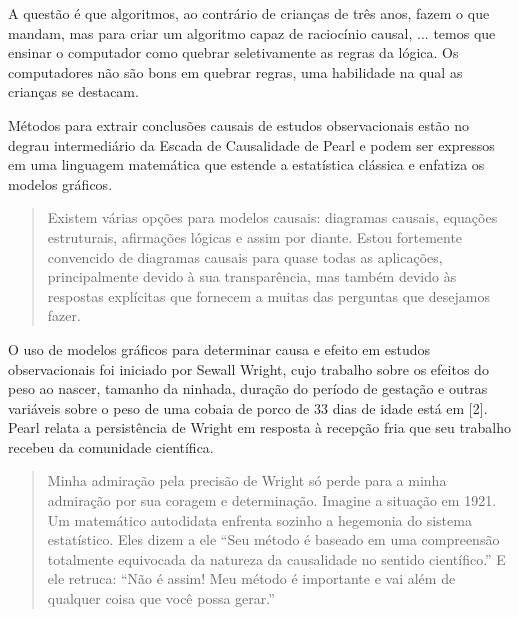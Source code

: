     A questão é que algoritmos, ao contrário de crianças de três anos, fazem o que mandam, mas para criar um algoritmo capaz de raciocínio causal, ... temos que ensinar o computador como quebrar seletivamente as regras da lógica. Os computadores não são bons em quebrar regras, uma habilidade na qual as crianças se destacam.



\noindent
\begin{minipage}[!ht]{\columnwidth}\centering
{}
\label{fig:01}
\end{minipage}



    Métodos para extrair conclusões causais de estudos observacionais estão no degrau intermediário da Escada de Causalidade de Pearl e podem ser expressos em uma linguagem matemática que estende a estatística clássica e enfatiza os modelos gráficos.

\begin{quotation}
    Existem várias opções para modelos causais: diagramas causais, equações estruturais, afirmações lógicas e assim por diante. Estou fortemente convencido de diagramas causais para quase todas as aplicações, principalmente devido à sua transparência, mas também devido às respostas explícitas que fornecem a muitas das perguntas que desejamos fazer.
\end{quotation}

    O uso de modelos gráficos para determinar causa e efeito em estudos observacionais foi iniciado por Sewall Wright, cujo trabalho sobre os efeitos do peso ao nascer, tamanho da ninhada, duração do período de gestação e outras variáveis sobre o peso de uma cobaia de porco de 33 dias de idade está em [2]. Pearl relata a persistência de Wright em resposta à recepção fria que seu trabalho recebeu da comunidade científica.

\begin{quotation}
    Minha admiração pela precisão de Wright só perde para a minha admiração por sua coragem e determinação. Imagine a situação em 1921. Um matemático autodidata enfrenta sozinho a hegemonia do sistema estatístico. Eles dizem a ele ``Seu método é baseado em uma compreensão totalmente equivocada da natureza da causalidade no sentido científico.'' E ele retruca: ``Não é assim! Meu método é importante e vai além de qualquer coisa que você possa gerar.''
\end{quotation}

